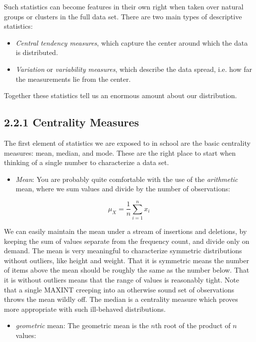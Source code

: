 \documentclass[10pt]{article}
\begin{document}
Such statistics can become features in their own right when taken over natural groups or clusters in the full data set. There are two main types of descriptive statistics:

\begin{itemize}
  \item \textit{Central tendency measures}, which capture the center around which the data is distributed.
  \item \textit{Variation} or \textit{variability measures}, which describe the data spread, i.e. how far the measurements lie from the center.
\end{itemize}

Together these statistics tell us an enormous amount about our distribution.

\subsection*{2.2.1 Centrality Measures}
The first element of statistics we are exposed to in school are the basic centrality measures: mean, median, and mode. These are the right place to start when thinking of a single number to characterize a data set.

\begin{itemize}
  \item \textit{Mean}: You are probably quite comfortable with the use of the \textit{arithmetic} mean, where we sum values and divide by the number of observations:
\end{itemize}

\[
\mu_{X}=\frac{1}{n} \sum_{i=1}^{n} x_{i}
\]

We can easily maintain the mean under a stream of insertions and deletions, by keeping the sum of values separate from the frequency count, and divide only on demand.
The mean is very meaningful to characterize symmetric distributions without outliers, like height and weight. That it is symmetric means the number of items above the mean should be roughly the same as the number
below. That it is without outliers means that the range of values is reasonably tight. Note that a single MAXINT creeping into an otherwise sound set of observations throws the mean wildly off. The median is a centrality measure which proves more appropriate with such ill-behaved distributions.

\begin{itemize}
  \item \textit{geometric} mean: The geometric mean is the \(n\)th root of the product of \(n\) values:
\end{itemize}
\end{document}
